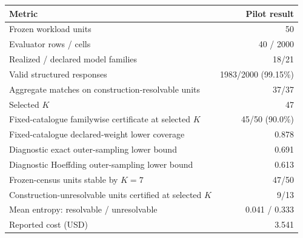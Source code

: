 \begin{tabular}{lr}
\toprule
Metric & Pilot result \\
\midrule
Frozen workload units & 50 \\
Evaluator rows / cells & 40 / 2000 \\
Realized / declared model families & 18/21 \\
Valid structured responses & 1983/2000 (99.15\%) \\
Aggregate matches on construction-resolvable units & 37/37 \\
Selected $K$ & 47 \\
Fixed-catalogue familywise certificate at selected $K$ & 45/50 (90.0\%) \\
Fixed-catalogue declared-weight lower coverage & 0.878 \\
Diagnostic exact outer-sampling lower bound & 0.691 \\
Diagnostic Hoeffding outer-sampling lower bound & 0.613 \\
Frozen-census units stable by $K=7$ & 47/50 \\
Construction-unresolvable units certified at selected $K$ & 9/13 \\
Mean entropy: resolvable / unresolvable & 0.041 / 0.333 \\
Reported cost (USD) & 3.541 \\
\bottomrule
\end{tabular}
